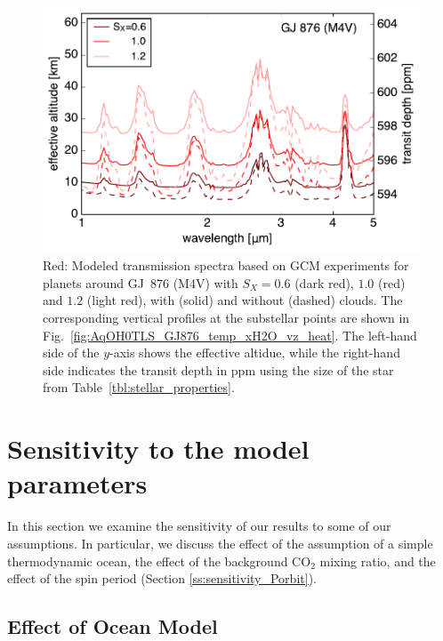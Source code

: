 \documentclass[11pt,numberedappendix,twocolappendix,]{emulateapj}
\begin{document}
\begin{figure}[!h]
    \begin{center}
    \includegraphics[width=\hsize]{fig/transit_GJ876.pdf}
    \end{center}
\caption{Red: Modeled transmission spectra based on GCM experiments for planets around GJ~876 (M4V) with $S_X=0.6$ (dark red), $1.0$ (red) and $1.2$ (light red), with (solid) and without (dashed) clouds. The corresponding vertical profiles at the substellar points are shown in Fig.~\ref{fig:AqOH0TLS_GJ876_temp_xH2O_vz_heat}. The left-hand side of the $y$-axis shows the effective altidue, while the right-hand side indicates the transit depth in ppm using the size of the star from Table~\ref{tbl:stellar_properties}.}
\label{fig:transmission}
\end{figure}


\section{Sensitivity to the model parameters}
\label{s:sensitivity}

In this section we examine the sensitivity of our results to some of our assumptions. 
In particular, we discuss the effect of the assumption of a simple thermodynamic ocean, the effect of the background CO$_2$ mixing ratio, and the effect of the spin period (Section \ref{ss:sensitivity_Porbit}). 



\subsection{Effect of Ocean Model}
\label{ss:sensitivity_ocean}
\end{document}
